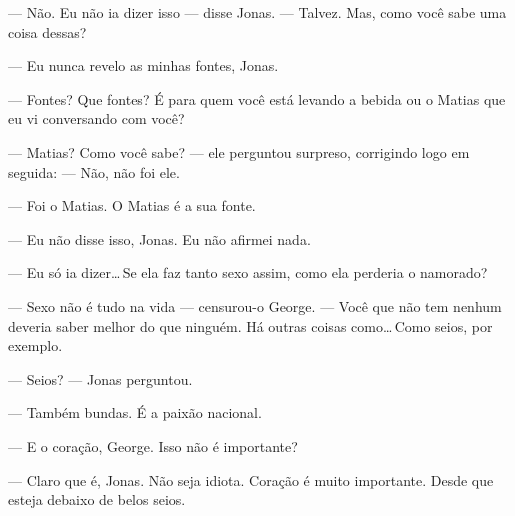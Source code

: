 --- Não. Eu não ia dizer isso --- disse Jonas. --- Talvez. Mas, como você sabe uma coisa dessas?

--- Eu nunca revelo as minhas fontes, Jonas.

--- Fontes? Que fontes? É para quem você está levando a bebida ou o Matias\mudanca{,} que eu vi conversando com você?

--- Matias? Como você sabe? --- ele perguntou surpreso, corrigindo logo em seguida: --- Não, não foi ele.

--- Foi o Matias. O Matias é a sua fonte.

--- Eu não disse isso, Jonas. Eu não afirmei nada.

--- Eu só ia dizer\ldots\,Se ela faz tanto sexo assim, como ela perderia o namorado?

--- Sexo não é tudo na vida --- censurou-o George. --- Você que não tem nenhum deveria saber melhor do que ninguém. Há outras coisas como\ldots\,Como seios, por exemplo.

--- Seios? --- Jonas perguntou.

--- Também bundas. É a paixão nacional.

--- E o coração, George. Isso não é importante?

--- Claro que é, Jonas. Não seja idiota. Coração é muito importante. Desde que esteja debaixo de belos seios.
